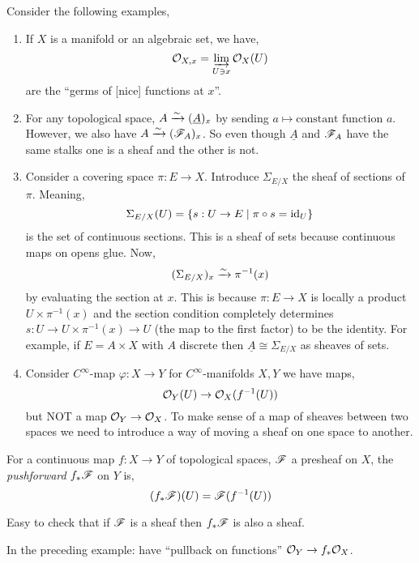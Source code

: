 \documentclass[12pt]{article}
\begin{document}
\begin{example}
Consider the following examples,
\begin{enumerate}
\item If $X$ is a manifold or an algebraic set, we have,
\[ \mathcal{O}_{X, x} = \varinjlim_{U \ni x} \mathcal{O}_{X}(U) \]
are the ``germs of [nice] functions at $x$''. 
\item
For any topological space, $A \xrightarrow{\sim} (\underline{A})_x$ by sending $a \mapsto \text{constant function } a$. However, we also have $A \xrightarrow{\sim} (\mathscr{F}_A)_x$. So even though $\underline{A}$ and $\mathscr{F}_A$ have the same stalks one is a sheaf and the other is not.
\item Consider a covering space $\pi : E \to X$. Introduce $\Sigma_{E/X}$ the sheaf of sections of $\pi$. Meaning,
\[ \Sigma_{E/X}(U) = \{ s : U \to E \mid \pi \circ s = \mathrm{id}_U \} \]
is the set of continuous sections. This is a sheaf of sets because continuous maps on opens glue. Now,
\[ (\Sigma_{E/X})_x \xrightarrow{\sim} \pi^{-1}(x) \]
by evaluating the section at $x$. This is because $\pi : E \to X$ is locally a product $U \times \pi^{-1}(x)$ and the section condition completely determines $s : U \to U \times \pi^{-1}(x) \to U$ (the map to the first factor) to be the identity. For example, if $E = A \times X$ with $A$ discrete then $\underline{A} \cong \Sigma_{E/X}$ as sheaves of sets.
\item Consider $C^\infty$-map $\varphi : X \to Y$ for $C^\infty$-manifolds $X, Y$ we have maps,
\[ \mathcal{O}_{Y}(U) \to \mathcal{O}_{X}(f^{-1}(U)) \]
but NOT a map $\mathcal{O}_{Y} \to \mathcal{O}_{X}$. To make sense of a map of sheaves between two spaces we need to introduce a way of moving a sheaf on one space to another.
\end{enumerate}
\end{example}

\begin{defn}
For a continuous map $f : X \to Y$ of topological spaces, $\mathscr{F}$ a presheaf on $X$, the \textit{pushforward} $f_* \mathscr{F}$ on $Y$ is,
\[ (f_* \mathscr{F})(U) = \mathscr{F}(f^{-1}(U)) \]
\end{defn}

\begin{rmk}
Easy to check that if $\mathscr{F}$ is a sheaf then $f_* \mathscr{F}$ is also a sheaf.
\end{rmk}

\begin{rmk}
In the preceding example: have ``pullback on functions'' $\mathcal{O}_{Y} \to f_* \mathcal{O}_{X}$.
\end{rmk}
\end{document}
